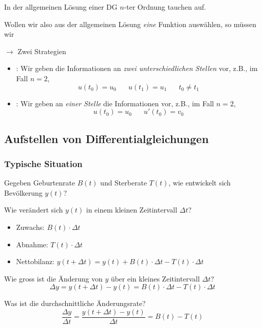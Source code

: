 In der allgemeinen Lösung einer DG $n$-ter Ordnung tauchen  auf.

Wollen wir also aus der allgemeinen Lösung \textit{eine} Funktion auswählen, so müssen wir 

$\to$ Zwei Strategien
\vspace{-0.6em}
\begin{itemize}
    \item {}: Wir geben die Informationen an \textit{zwei unterschiedlichen Stellen} vor, z.B., im Fall $n = 2$,
    $$u(t_0) = u_0 \hspace{20pt} u(t_1) = u_1 \hspace{20pt} t_0 \ne t_1$$
    \item {}: Wir geben an \textit{einer Stelle} die Informationen vor, z.B., im Fall $n = 2$,
    $$u(t_0) = u_0 \hspace{20pt} u'(t_0) = v_0$$
\end{itemize}

\subsection{Aufstellen von Differentialgleichungen}

\subsubsection{Typische Situation}

Gegeben Geburtenrate $B(t)$ und Sterberate $T(t)$, wie entwickelt sich Bevölkerung $y(t)$?

Wie verändert sich $y(t)$ in einem kleinen Zeitintervall $\Delta t$?
\vspace{-0.6em}
\begin{itemize}
    \item Zuwachs: $B(t) \cdot \Delta t$
    \item Abnahme: $T(t) \cdot \Delta t$
    \item Nettobilanz: $y(t + \Delta t) = y(t) + B(t) \cdot \Delta t - T(t) \cdot \Delta t$
\end{itemize}

Wie gross ist die Änderung von $y$ über ein kleines Zeitintervall $\Delta t$?
$$\Delta y = y(t + \Delta t) - y(t) = B(t) \cdot \Delta t - T(t) \cdot \Delta t $$

Was ist die durchschnittliche Änderungsrate?
$$\frac{\Delta y}{\Delta t} = \frac{y(t + \Delta t) - y(t)}{\Delta t} = B(t) - T(t)$$

